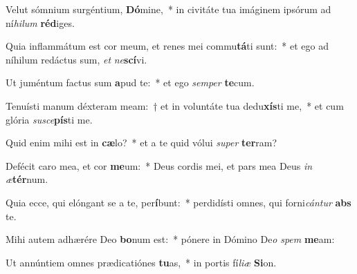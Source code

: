 \item Velut sómnium surgéntium, \textbf{Dó}mine,~* in civitáte tua imáginem ipsórum ad ní\textit{hi}\textit{lum} \textbf{réd}iges.
\item Quia inflammátum est cor meum, et renes mei commu\textbf{tá}ti sunt:~* et ego ad níhilum redáctus sum, \textit{et} \textit{ne}\textbf{scí}vi.
\item Ut juméntum factus sum \textbf{a}pud te:~* et ego \textit{sem}\textit{per} \textbf{te}cum.
\item Tenuísti manum déxteram meam:~† et in voluntáte tua dedu\textbf{xís}ti me,~* et cum glória \textit{su}\textit{sce}\textbf{pís}ti me.
\item Quid enim mihi est in \textbf{cæ}lo?~* et a te quid vólui \textit{su}\textit{per} \textbf{ter}ram?
\item Defécit caro mea, et cor \textbf{me}um:~* Deus cordis mei, et pars mea Deus \textit{in} \textit{æ}\textbf{tér}num.
\item Quia ecce, qui elóngant se a te, per\textbf{í}bunt:~* perdidísti omnes, qui forni\textit{cán}\textit{tur} \textbf{abs} te.
\item Mihi autem adhærére Deo \textbf{bo}num est:~* pónere in Dómino De\textit{o} \textit{spem} \textbf{me}am:
\item Ut annúntiem omnes prædicatiónes \textbf{tu}as,~* in portis fí\textit{li}\textit{æ} \textbf{Si}on.
